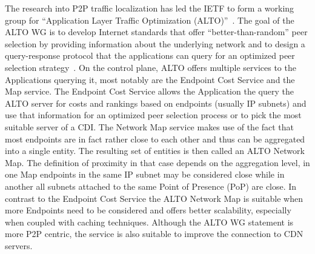 The research into P2P traffic localization has led the IETF to form a working
group for ``Application Layer Traffic Optimization (ALTO)''~\cite{ALTO-WG}.
The goal of the ALTO WG is to develop Internet standards that offer
``better-than-random'' peer selection by providing information about the
underlying network and to design a query-response protocol that the
applications can query for an optimized peer selection
strategy~\cite{ietf-alto-protocol}.  On the control plane, ALTO offers multiple
services to the Applications querying it, most notably are the Endpoint Cost
Service and the Map service. The Endpoint Cost Service allows the Application
the query the ALTO server for costs and rankings based on endpoints (usually IP
subnets) and use that information for an optimized peer selection process or to
pick the most suitable server of a CDI. The Network Map service makes use of
the fact that most endpoints are in fact rather close to each other and thus
can be aggregated into a single entity. The resulting set of entities is then
called an ALTO Network Map. The definition of proximity in that case depends on
the aggregation level, in one Map endpoints in the same IP subnet may be
considered close while in another all subnets attached to the same Point of
Presence (PoP) are close. In contrast to the Endpoint Cost Service the ALTO
Network Map is suitable when more Endpoints need to be considered and offers
better scalability, especially when coupled with caching techniques. Although
the ALTO WG statement is more P2P centric, the service is also suitable to
improve the connection to CDN servers.

